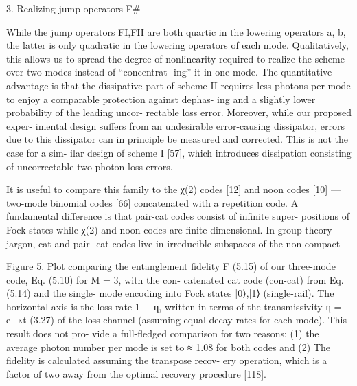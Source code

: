 \documentclass[12]{amsart}
\newcommand\0{\mathbf{0}}
\newcommand\<{\langle}
\renewcommand\>{\rangle}
\begin{document}
3. Realizing jump operators F\#

While the jump operators FI,FII are both quartic in the lowering operators a, b, the latter is only quadratic in the lowering operators of each mode. Qualitatively, this allows us to spread the degree of nonlinearity required to realize the scheme over two modes instead of “concentrat- ing” it in one mode. The quantitative advantage is that the dissipative part of scheme II requires less photons per mode to enjoy a comparable protection against dephas- ing and a slightly lower probability of the leading uncor- rectable loss error. Moreover, while our proposed exper- imental design suffers from an undesirable error-causing dissipator, errors due to this dissipator can in principle be measured and corrected. This is not the case for a sim- ilar design of scheme I [57], which introduces dissipation consisting of uncorrectable two-photon-loss errors.

It is useful to compare this family to the χ(2) codes [12] and noon codes [10] — two-mode binomial codes [66] concatenated with a repetition code. A fundamental difference is that pair-cat codes consist of infinite super- positions of Fock states while χ(2) and noon codes are finite-dimensional. In group theory jargon, cat and pair- cat codes live in irreducible subspaces of the non-compact

Figure 5. Plot comparing the entanglement fidelity F (5.15) of our three-mode code, Eq. (5.10) for M = 3, with the con- catenated cat code (con-cat) from Eq. (5.14) and the single- mode encoding into Fock states {|0⟩,|1⟩} (single-rail). The horizontal axis is the loss rate 1 − η, written in terms of the transmissivity η = e−κt (3.27) of the loss channel (assuming equal decay rates for each mode). This result does not pro- vide a full-fledged comparison for two reasons: (1) the average photon number per mode is set to ≈ 1.08 for both codes and (2) The fidelity is calculated assuming the transpose recov- ery operation, which is a factor of two away from the optimal recovery procedure [118].
\end{document}
